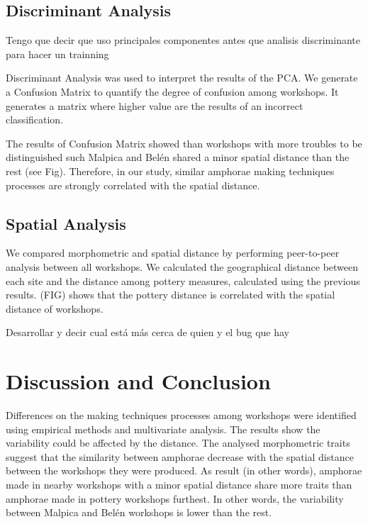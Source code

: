 \documentclass[review]{elsarticle}
\begin{document}
\subsection{Discriminant Analysis}

Tengo que decir que uso principales componentes antes que analisis discriminante para hacer un trainning 

Discriminant Analysis was used to interpret the results of the PCA. We generate a Confusion Matrix to quantify the degree of confusion among workshops. It generates a matrix where higher value are the results of an incorrect classification. 





The results of Confusion Matrix showed than workshops with more troubles to be distinguished such Malpica and Belén shared a minor spatial distance than the rest (see Fig). Therefore, in our study, similar amphorae making techniques processes are strongly correlated with the spatial distance. 

\subsection{Spatial Analysis}

We compared morphometric and spatial distance by performing peer-to-peer analysis between all workshops. We calculated the geographical distance between each site and the distance among pottery measures, calculated using the previous results. (FIG) shows that the pottery distance is correlated with the spatial distance of workshops.

Desarrollar y decir cual está más cerca de quien y el bug que hay


\section{Discussion and Conclusion}

Differences on the making techniques processes among workshops were identified using empirical methods and  multivariate analysis. The results show the variability could be affected by the distance. The analysed morphometric traits suggest that the similarity between amphorae decrease with the spatial distance between the workshops they were produced. As result (in other words), amphorae made in nearby workshops with a minor spatial distance share more traits than amphorae made in pottery workshops furthest. In other words, the variability between Malpica and Bel\'en workshops is lower than the rest. 
\end{document}
